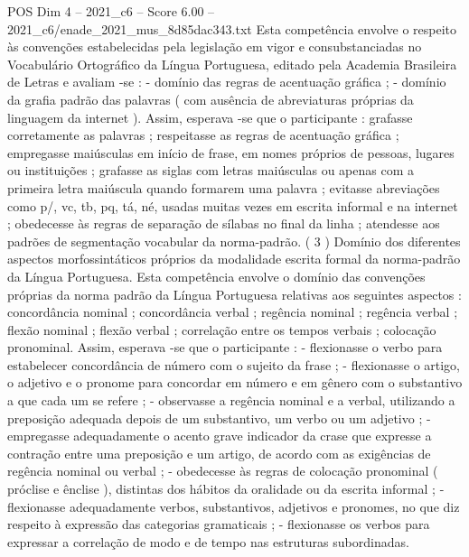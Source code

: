 \begin{textsample}{POS Dim 4 – 2021\_c6 – Score 6.00 – 2021\_c6/enade\_2021\_mus\_8d85dac343.txt}
Esta competência envolve o respeito às convenções estabelecidas pela legislação em vigor e consubstanciadas no Vocabulário Ortográfico da Língua Portuguesa, editado pela Academia Brasileira de Letras e avaliam -se : - domínio das regras de acentuação gráfica ; - domínio da grafia padrão das palavras ( com ausência de abreviaturas próprias da linguagem da internet ).
Assim, esperava -se que o participante : grafasse corretamente as palavras ; respeitasse as regras de acentuação gráfica ; empregasse maiúsculas em início de frase, em nomes próprios de pessoas, lugares ou instituições ; grafasse as siglas com letras maiúsculas ou apenas com a primeira letra maiúscula quando formarem uma palavra ; evitasse abreviações como p/, vc, tb, pq, tá, né, usadas muitas vezes em escrita informal e na internet ; obedecesse às regras de separação de sílabas no final da linha ; atendesse aos padrões de segmentação vocabular da norma-padrão. ( 3 ) Domínio dos diferentes aspectos morfossintáticos próprios da modalidade escrita formal da norma-padrão da Língua Portuguesa.
Esta competência envolve o domínio das convenções próprias da norma padrão da Língua Portuguesa relativas aos seguintes aspectos : concordância nominal ; concordância verbal ; regência nominal ; regência verbal ; flexão nominal ; flexão verbal ; correlação entre os tempos verbais ; colocação pronominal.
Assim, esperava -se que o participante : - flexionasse o verbo para estabelecer concordância de número com o sujeito da frase ; - flexionasse o artigo, o adjetivo e o pronome para concordar em número e em gênero com o substantivo a que cada um se refere ; - observasse a regência nominal e a verbal, utilizando a preposição adequada depois de um substantivo, um verbo ou um adjetivo ; - empregasse adequadamente o acento grave indicador da crase que expresse a contração entre uma preposição e um artigo, de acordo com as exigências de regência nominal ou verbal ; - obedecesse às regras de colocação pronominal ( próclise e ênclise ), distintas dos hábitos da oralidade ou da escrita informal ; - flexionasse adequadamente verbos, substantivos, adjetivos e pronomes, no que diz respeito à expressão das categorias gramaticais ; - flexionasse os verbos para expressar a correlação de modo e de tempo nas estruturas subordinadas.

\end{textsample}

